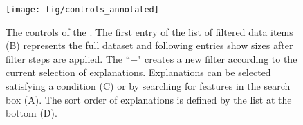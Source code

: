 \begin{figure}[hb!]
\centering
\texttt{[image: fig/controls\_annotated]}
\caption{
The controls of the \tabB .
The first entry of the list of filtered data items (B) represents the full dataset and following entries show sizes after filter steps are applied.
The ``+" creates a new filter according to the current selection of explanations.
Explanations can be selected satisfying a condition (C) or by searching for features in the search box (A).
The sort order of explanations is defined by the list at the bottom (D).
}
\label{figs:controls}
\end{figure}